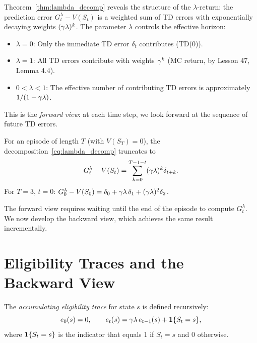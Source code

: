 \documentclass[11pt,a4paper]{article}
\begin{document}
\begin{remark}[Interpretation]
\label{rem:decomp_interp}
Theorem~\ref{thm:lambda_decomp} reveals the structure of the
$\lambda$-return: the prediction error $G_t^\lambda - V(S_t)$ is a
weighted sum of TD errors with exponentially decaying weights
$(\gamma\lambda)^k$. The parameter $\lambda$ controls the
effective horizon:
\begin{itemize}[nosep]
  \item $\lambda = 0$: Only the immediate TD error $\delta_t$
    contributes (TD(0)).
  \item $\lambda = 1$: All TD errors contribute with weights
    $\gamma^k$ (MC return, by Lesson 47, Lemma 4.4).
  \item $0 < \lambda < 1$: The effective number of contributing TD
    errors is approximately $1/(1 - \gamma\lambda)$.
\end{itemize}
This is the \emph{forward view}: at each time step, we look forward
at the sequence of future TD errors.
\end{remark}

\begin{example}
\label{ex:finite_episode}
For an episode of length $T$ (with $V(S_T) = 0$), the
decomposition~\eqref{eq:lambda_decomp} truncates to
\begin{equation}
  G_t^\lambda - V(S_t) = \sum_{k=0}^{T-1-t}
  (\gamma\lambda)^k \delta_{t+k}.
  \label{eq:finite_decomp}
\end{equation}
For $T = 3$, $t = 0$:
$G_0^\lambda - V(S_0) = \delta_0 + \gamma\lambda\,\delta_1
+ (\gamma\lambda)^2 \delta_2$.
\end{example}

The forward view requires waiting until the end of the episode to
compute $G_t^\lambda$. We now develop the backward view, which achieves
the same result incrementally.

\section{Eligibility Traces and the Backward View}
\label{sec:backward}

\begin{definition}
\label{def:trace}
The \emph{accumulating eligibility trace} for state $s$ is defined
recursively:
\begin{equation}
  e_0(s) = 0, \qquad
  e_t(s) = \gamma\lambda\,e_{t-1}(s) + \mathbf{1}\{S_t = s\},
  \label{eq:trace}
\end{equation}
where $\mathbf{1}\{S_t = s\}$ is the indicator that equals 1 if
$S_t = s$ and 0 otherwise.
\end{definition}
\end{document}
